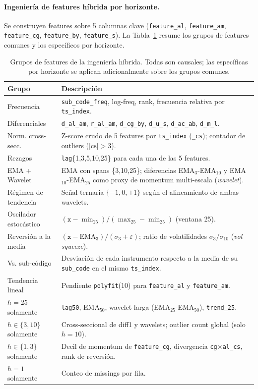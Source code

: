 \documentclass{article}
\begin{document}
\paragraph{Ingeniería de features híbrida por horizonte.}
Se construyen features sobre 5 columnas clave (\texttt{feature\_al}, \texttt{feature\_am}, \texttt{feature\_cg}, \texttt{feature\_by}, \texttt{feature\_s}). La Tabla~\ref{tab:hybrid_feats} resume los grupos de features comunes y los específicos por horizonte.

\begin{table}[h!]
  \caption{Grupos de features de la ingeniería híbrida. Todas son causales; las específicas por horizonte se aplican adicionalmente sobre los grupos comunes.}
  \label{tab:hybrid_feats}
  \centering
  \begin{tabular}{lp{9cm}}
    \toprule
    Grupo & Descripción \\
    \midrule
    Frecuencia & \texttt{sub\_code\_freq}, log-freq, rank, frecuencia relativa por \texttt{ts\_index}. \\
    Diferenciales & \texttt{d\_al\_am}, \texttt{r\_al\_am}, \texttt{d\_cg\_by}, \texttt{d\_u\_s}, \texttt{d\_ac\_ab}, \texttt{d\_m\_l}. \\
    Norm. cross-secc. & Z-score crudo de 5 features por \texttt{ts\_index} (\texttt{\_cs}); contador de outliers ($|\text{cs}| > 3$). \\
    Rezagos & \texttt{lag}\{1,3,5,10,25\} para cada una de las 5 features. \\
    EMA + Wavelet & EMA con spans \{3,10,25\}; diferencias EMA$_3$-EMA$_{10}$ y EMA$_{10}$-EMA$_{25}$ como proxy de momentum multi-escala (\emph{wavelet}). \\
    Régimen de tendencia & Señal ternaria $\{-1, 0, +1\}$ según el alineamiento de ambas wavelets. \\
    Oscilador estocástico & $(\texttt{x} - \min_{25}) / (\max_{25} - \min_{25})$ (ventana 25). \\
    Reversión a la media & $(\texttt{x} - \text{EMA}_3) / (\sigma_{3} + \varepsilon)$; ratio de volatilidades $\sigma_3 / \sigma_{10}$ (\emph{vol squeeze}). \\
    Vs. sub-código & Desviación de cada instrumento respecto a la media de su \texttt{sub\_code} en el mismo \texttt{ts\_index}. \\
    Tendencia lineal & Pendiente \texttt{polyfit}(10) para \texttt{feature\_al} y \texttt{feature\_am}. \\
    \midrule
    $h = 25$ solamente & \texttt{lag50}, EMA$_{50}$, wavelet larga (EMA$_{25}$-EMA$_{50}$), \texttt{trend\_25}. \\
    $h \in \{3,10\}$ solamente & Cross-seccional de diff1 y wavelets; outlier count global (solo $h=10$). \\
    $h \in \{1,3\}$ solamente & Decil de momentum de \texttt{feature\_cg}, divergencia \texttt{cg}$\times$\texttt{al\_cs}, rank de reversión. \\
    $h = 1$ solamente & Conteo de missings por fila. \\
    \bottomrule
  \end{tabular}
\end{table}
\end{document}
